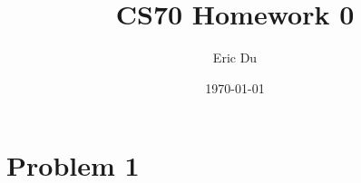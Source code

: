 \documentclass{article}
\title{CS70 Homework 0}
\author{Eric Du}
\date{\today}
\theoremstyle{definition}
\numberwithin{equation}{section}
\numberwithin{definition}{section}
\begin{document}
\maketitle

\section{Problem 1}
\end{document}
